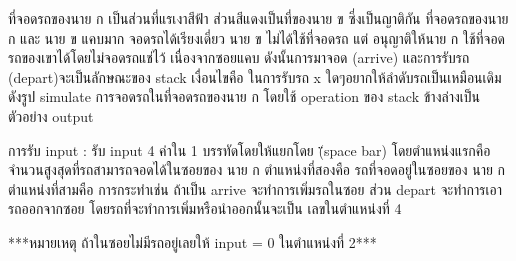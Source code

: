 ที่จอดรถของนาย ก เป็นส่วนที่แรเงาสีฟ้า ส่วนสีแดงเป็นที่ของนาย ข ซี่งเป็นญาติกัน ที่จอดรถของนาย ก และ นาย ข แคบมาก จอดรถได้เรียงเดี่ยว นาย ข ไม่ได้ใช้ที่จอดรถ แต่ อนุญาติให้นาย ก ใช้ที่จอดรถของเขาได้โดยไม่จอดรถแช่ไว้ เนื่องจากซอยแคบ ดังนั้นการมาจอด (arrive) และการรับรถ (depart)จะเป็นลักษณะของ stack เงื่อนไขคือ ในการรับรถ x ใดๆอยากให้ลำดับรถเป็นเหมือนเดิม ดังรูป simulate การจอดรถในที่จอดรถของนาย ก โดยใช้ operation ของ stack ข้างล่างเป็นตัวอย่าง output

การรับ input : รับ input 4 ค่าใน 1 บรรทัดโดยให้แยกโดย \" \" (space bar) โดยตำแหน่งแรกคือ จำนวนสูงสุดที่รถสามารถจอดได้ในซอยของ นาย ก ตำแหน่งที่สองคือ รถที่จอดอยู่ในซอยของ นาย ก ตำแหน่งที่สามคือ การกระทำเช่น ถ้าเป็น arrive จะทำการเพิ่มรถในซอย ส่วน depart จะทำการเอารถออกจากซอย โดยรถที่จะทำการเพิ่มหรือนำออกนั้นจะเป็น เลขในตำแหน่งที่ 4

***หมายเหตุ ถ้าในซอยไม่มีรถอยู่เลยให้ input = 0 ในตำแหน่งที่ 2***